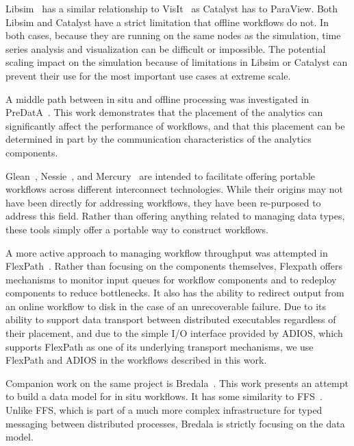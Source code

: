 \documentclass[conference]{IEEEtran}
\begin{document}
Libsim~\cite{whitlock:2011:libsim} has a similar relationship to
VisIt~\cite{Riedel:2007:visit} as Catalyst has to ParaView. Both Libsim and
Catalyst have a strict limitation that offline workflows do not. In both cases,
because they are running on the same nodes as the simulation, time series
analysis and visualization can be difficult or impossible. The potential
scaling impact on the simulation because of limitations in Libsim or Catalyst
can prevent their use for the most important use cases at extreme scale.

A middle path between in situ and offline processing was investigated in
PreDatA~\cite{zheng:2010:predata}.
This work demonstrates that the placement of the analytics can significantly
affect the performance of workflows, and that this placement can be determined
in part by the communication characteristics of the analytics components.

Glean~\cite{vishwanath:2011:glean}, Nessie~\cite{oldfield:lwfs-data-movement},
and Mercury~\cite{Soumagne:2013:mercury} are intended to facilitate offering
portable workflows across different interconnect technologies. While their
origins may not have been directly for addressing workflows, they have been
re-purposed to address this field. Rather than offering anything related to
managing data types, these tools simply offer a portable way to construct
workflows.

A more active approach to managing workflow throughput was attempted in
FlexPath~\cite{Dayal:2014:flexpath}. Rather than focusing on the components
themselves, Flexpath offers mechanisms to monitor input queues for workflow
components and to redeploy components to reduce bottlenecks. It also has the
ability to redirect output from an online workflow to disk in the case of an
unrecoverable failure. Due to its ability to support data transport between
distributed executables regardless of their placement, and due to the simple I/O
interface provided by ADIOS, which supports FlexPath as one of its underlying
transport mechanisms, we use FlexPath and ADIOS in the workflows described
in this work.

Companion work on the same project is Bredala~\cite{dreher:2016:bredala}. This
work presents an attempt to build a data model for in situ workflows. It has
some similarity to FFS~\cite{eisenhauer:2011:ffs}. Unlike FFS, which is part
of a much more complex infrastructure for typed messaging between distributed
processes, Bredala is strictly focusing on the data model.
\end{document}
